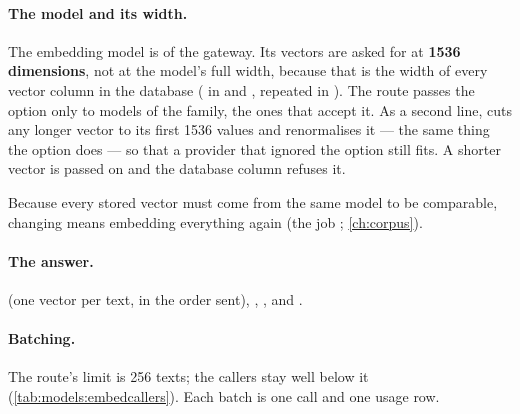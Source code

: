 \paragraph{The model and its width.} The embedding model is
 of the gateway. Its vectors are asked for at
\textbf{1536 dimensions}, not at the model's full width, because that is the width of every
vector column in the database ( in  and
, repeated in ). The route passes the
 option only to models of the  family, the ones that
accept it. As a second line,  cuts any longer vector to its first 1536
values and renormalises it --- the same thing the option does --- so that a provider that
ignored the option still fits. A shorter vector is passed on and the database column refuses
it.

Because every stored vector must come from the same model to be comparable, changing
 means embedding everything again (the job ;
\cref{ch:corpus}).

\paragraph{The answer.}  (one vector per text, in the order sent),
, ,  and .

\paragraph{Batching.} The route's limit is 256 texts; the callers stay well below it
(\cref{tab:models:embedcallers}). Each batch is one call and one usage row.

